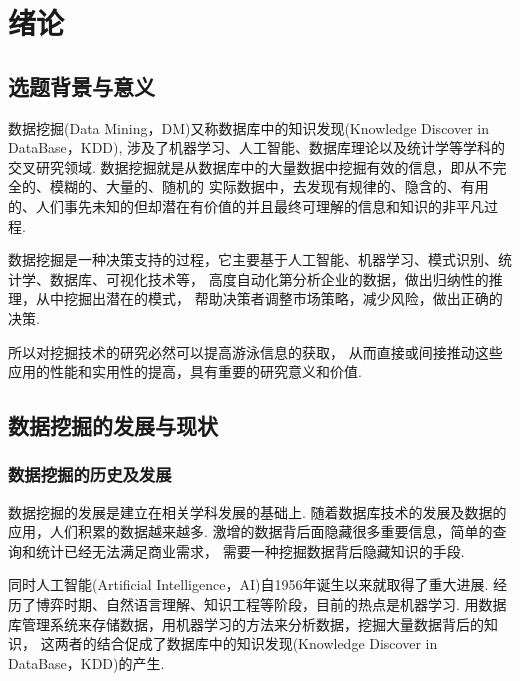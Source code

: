 \documentclass[bachelor,adobefonts]{jnuthesis}
\begin{document}
\tableofcontents

\mainmatter


\chapter{绪论}\label{chapter_introduction}
\section{选题背景与意义}
数据挖掘(Data Mining，DM)又称数据库中的知识发现(Knowledge Discover in DataBase，KDD),
涉及了机器学习、人工智能、数据库理论以及统计学等学科的交叉研究领域.
数据挖掘就是从数据库中的大量数据中挖掘有效的信息，即从不完全的、模糊的、大量的、随机的
实际数据中，去发现有规律的、隐含的、有用的、人们事先未知的但却潜在有价值的并且最终可理解的信息和知识的非平凡过程.

数据挖掘是一种决策支持的过程，它主要基于人工智能、机器学习、模式识别、统计学、数据库、可视化技术等，
高度自动化第分析企业的数据，做出归纳性的推理，从中挖掘出潜在的模式，
帮助决策者调整市场策略，减少风险，做出正确的决策.

所以对挖掘技术的研究必然可以提高游泳信息的获取，
从而直接或间接推动这些应用的性能和实用性的提高，具有重要的研究意义和价值.

\section{数据挖掘的发展与现状}
\subsection{数据挖掘的历史及发展}

数据挖掘的发展是建立在相关学科发展的基础上.
随着数据库技术的发展及数据的应用，人们积累的数据越来越多.
激增的数据背后面隐藏很多重要信息，简单的查询和统计已经无法满足商业需求，
需要一种挖掘数据背后隐藏知识的手段.

同时人工智能(Artificial Intelligence，AI)自1956年诞生以来就取得了重大进展.
经历了博弈时期、自然语言理解、知识工程等阶段，目前的热点是机器学习.
用数据库管理系统来存储数据，用机器学习的方法来分析数据，挖掘大量数据背后的知识，
这两者的结合促成了数据库中的知识发现(Knowledge Discover in DataBase，KDD)的产生.
\end{document}

